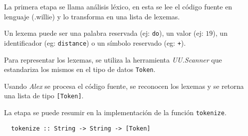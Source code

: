   La primera etapa se llama análisis léxico, en esta se lee el código
  fuente en lenguaje \frob{} (.willie) y lo transforma en una
  lista de lexemas.

  Un lexema puede ser una palabra reservada (ej: \texttt{do}),
  un valor (ej: $19$), un identificador (eg: \texttt{distance}) o
  un símbolo reservado (eg: \texttt{+}).

  Para representar los lexemas, se utiliza la
  herramienta \textit{UU.Scanner}
  \cite{uuparser} que estandariza los mismos en el tipo de
  datos \texttt{Token}.

  Usando \textit{Alex}\cite{alex} se procesa el código fuente,
  se reconocen los lexemas y se retorna una lista de
  tipo \texttt{[Token]}.

  La etapa se puede resumir en la implementación de la
  función \texttt{tokenize}.

\begin{Verbatim}
  tokenize :: String -> String -> [Token]
\end{Verbatim}

